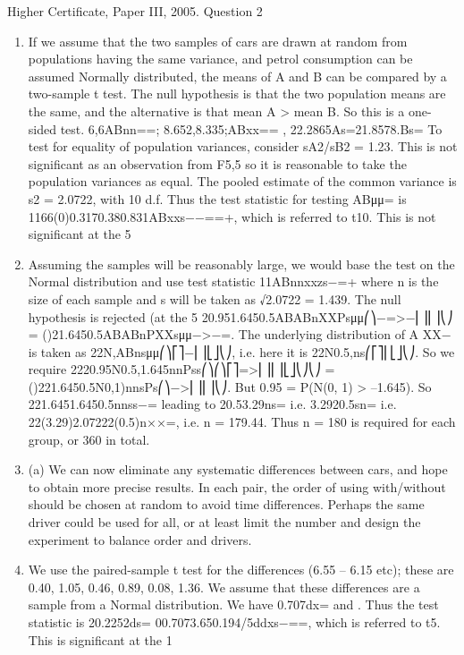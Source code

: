 \documentclass[a4paper,12pt]{article}
\begin{document}
Higher Certificate, Paper III, 2005. Question 2
\begin{enumerate}
\item If we assume that the two samples of cars are drawn at random from populations having the same variance, and petrol consumption can be assumed Normally distributed, the means of A and B can be compared by a two-sample t test.
The null hypothesis is that the two population means are the same, and the alternative is that mean A > mean B. So this is a one-sided test.
6,6ABnn==;
8.652,8.335;ABxx==
, 22.2865As=21.8578.Bs=
To test for equality of population variances, consider sA2/sB2 = 1.23. This is not significant as an observation from F5,5 so it is reasonable to take the population variances as equal.
The pooled estimate of the common variance is s2 = 2.0722, with 10 d.f.
Thus the test statistic for testing ABμμ= is
1166(0)0.3170.380.831ABxxs−−==+,
which is referred to t10. This is not significant at the 5%
\item Assuming the samples will be reasonably large, we would base the test on the Normal distribution and use test statistic 11ABnnxxzs−=+ where n is the size of each sample and s will be taken as √2.0722 = 1.439. The null hypothesis is rejected (at the 5%
20.951.6450.5ABABnXXPsμμ⎛⎞−=>−⎜⎟⎜⎟⎝⎠
= ()21.6450.5ABABnPXXsμμ−>−=.
The underlying distribution of A XX− is taken as 22N,ABnsμμ⎛⎞⎡⎤−⎜⎟⎣⎦⎝⎠, i.e. here it is 22N0.5,ns⎛⎡⎤⎜⎣⎦⎝⎠. So we require
2220.95N0.5,1.645nnPss⎛⎞⎛⎞⎡⎤=>⎜⎟⎜⎟⎣⎦⎝⎠⎝⎠ = ()221.6450.5N0,1)nnsPs⎛⎞−>⎜⎟⎜⎟⎝⎠.
But 0.95 = P(N(0, 1) > –1.645).
So 221.6451.6450.5nnss−= leading to
20.53.29ns= i.e. 3.2920.5sn= i.e. 22(3.29)2.07222(0.5)n××=,
i.e. n = 179.44. Thus n = 180 is required for each group, or 360 in total.
\item  (a) We can now eliminate any systematic differences between cars, and hope to obtain more precise results.
In each pair, the order of using with/without should be chosen at random to avoid time differences. Perhaps the same driver could be used for all, or at least limit the number and design the experiment to balance order and drivers.
\item  We use the paired-sample t test for the differences (6.55 – 6.15 etc); these are 0.40, 1.05, 0.46, 0.89, 0.08, 1.36. We assume that these differences are a sample from a Normal distribution.
We have 0.707dx= and . Thus the test statistic is 20.2252ds=
00.7073.650.194/5ddxs−==,
which is referred to t5. This is significant at the 1%
\end{enumerate}
\end{document}
